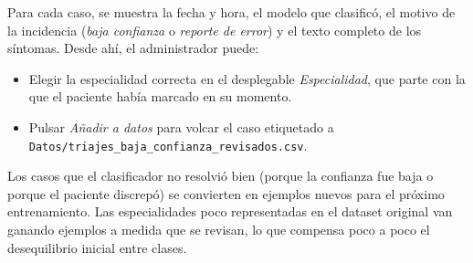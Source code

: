 
Para cada caso, se muestra la fecha y hora, el modelo que clasificó, el motivo de la incidencia (\textit{baja confianza} o \textit{reporte de error}) y el texto completo de los síntomas. Desde ahí, el administrador puede:

\begin{itemize}
	\item Elegir la especialidad correcta en el desplegable \textit{Especialidad}, que parte con la que el paciente había marcado en su momento.
	\item Pulsar \textit{Añadir a datos} para volcar el caso etiquetado a \texttt{Datos/triajes\_baja\_confianza\_revisados.csv}.
\end{itemize}

Los casos que el clasificador no resolvió bien (porque la confianza fue baja o porque el paciente discrepó) se convierten en ejemplos nuevos para el próximo entrenamiento. Las especialidades poco representadas en el dataset original van ganando ejemplos a medida que se revisan, lo que compensa poco a poco el desequilibrio inicial entre clases.